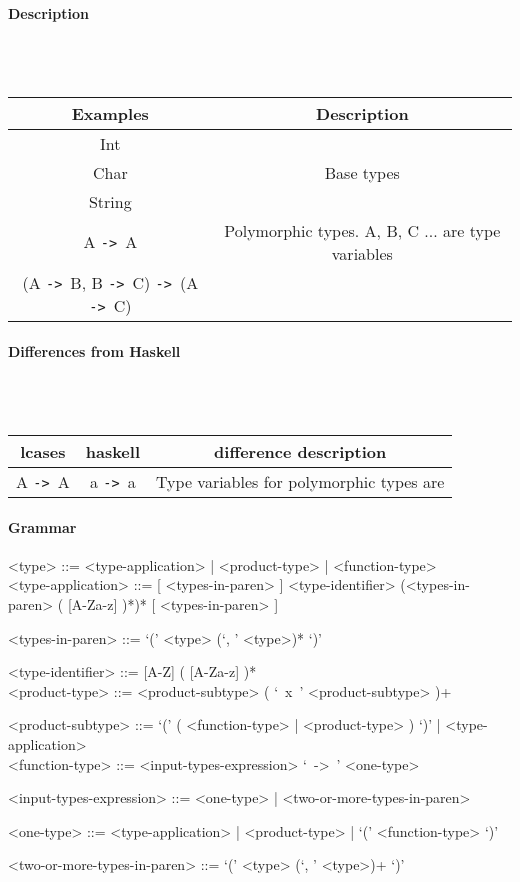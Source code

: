\documentclass{article}
\def\ra{\texttt{->}\ }
\def\pend{\mbox{} \\\\}
\begin{document}
\paragraph{Description}\pend
\begin{tabular}{ |c|c| } 
\hline
Examples & Description \\ 
\hline
\hline
Int & \\
Char & Base types \\
String & \\ 
\hline
A \ra A &
Polymorphic types. A, B, C ... are type variables
\\
(A \ra B, B \ra C) \ra (A \ra C) &
\\ 
\hline
\end{tabular}

\paragraph{Differences from Haskell}\pend
\begin{tabular}{ |c|c|c| } 
\hline
lcases & haskell & difference description \\ 
\hline
\hline
A \ra A & a \ra a & Type variables for polymorphic types are  \\ 
\hline
\end{tabular}

\paragraph{Grammar}
\begin{grammar}
<type> ::= <type-application> | <product-type> | <function-type> \\

<type-application> ::=
[ <types-in-paren> ] <type-identifier> (<types-in-paren> ( [A-Za-z] )*)* [ <types-in-paren> ] 

<types-in-paren> ::= `(' <type> (`, ' <type>)* `)'

<type-identifier> ::= [A-Z] ( [A-Za-z] )* \\ 
 
<product-type> ::= <product-subtype> ( `\ x\ ' <product-subtype> )+

<product-subtype> ::=
`(' ( <function-type> | <product-type> ) `)' | <type-application> \\

<function-type> ::= <input-types-expression> `\ ->\ ' <one-type>

<input-types-expression> ::= <one-type> | <two-or-more-types-in-paren>

<one-type> ::= <type-application> | <product-type> | `(' <function-type> `)'

<two-or-more-types-in-paren> ::=  `(' <type> (`, ' <type>)+ `)'
\end{grammar}
\end{document}
